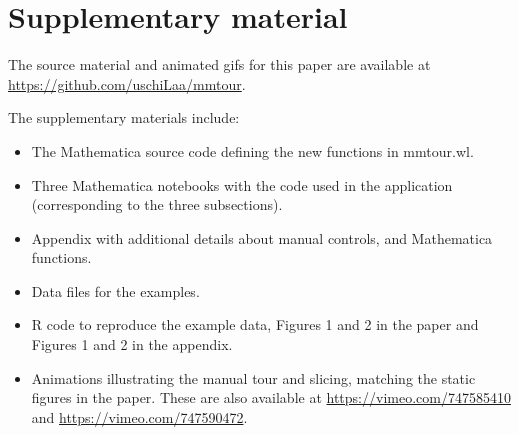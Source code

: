 \documentclass[]{interact}
\theoremstyle{plain}%
\theoremstyle{definition}
\theoremstyle{remark}
\providecommand{\tightlist}{%
  \setlength{\itemsep}{0pt}\setlength{\parskip}{0pt}}
\def\tightlist{}
\begin{document}
\hypertarget{supplementary-material}{%
\section*{Supplementary material}\label{supplementary-material}}

The source material and animated gifs for this paper are available at
\url{https://github.com/uschiLaa/mmtour}.

The supplementary materials include:

\begin{itemize}
\tightlist
\item
  The Mathematica source code defining the new functions in mmtour.wl.
\item
  Three Mathematica notebooks with the code used in the application
  (corresponding to the three subsections).
\item
  Appendix with additional details about manual controls, and
  Mathematica functions.
\item
  Data files for the examples.
\item
  R code to reproduce the example data, Figures 1 and 2 in the paper and
  Figures 1 and 2 in the appendix.
\item
  Animations illustrating the manual tour and slicing, matching the
  static figures in the paper. These are also available at
  \url{https://vimeo.com/747585410} and
  \url{https://vimeo.com/747590472}.
\end{itemize}



\end{document}
